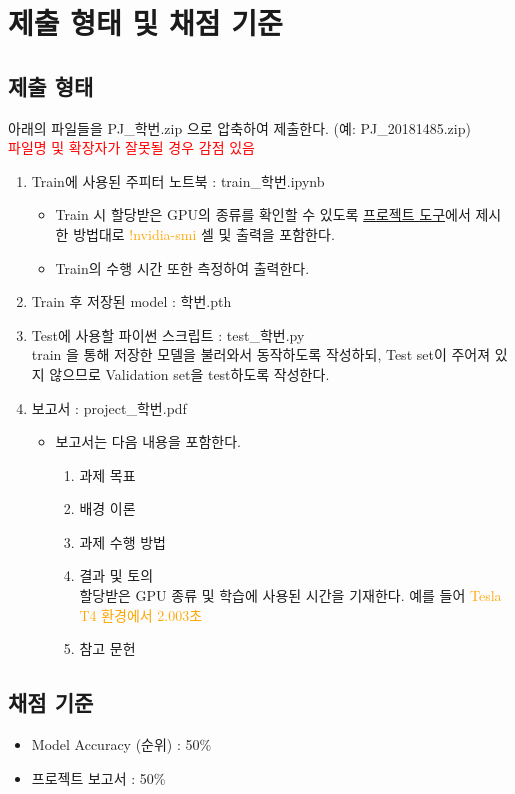\section{제출 형태 및 채점 기준}{\label{sec:eval}}

\subsection{제출 형태}
아래의 파일들을 \textcolor{RubineRed}{PJ\_학번.zip} 으로 압축하여 제출한다. (예: PJ\_20181485.zip)
\\ \textcolor{Red}{파일명 및 확장자가 잘못될 경우 감점 있음}
\begin{enumerate}\tightlist
    \item Train에 사용된 주피터 노트북 : \textcolor{RubineRed}{train\_학번.ipynb}
    \begin{itemize}
        \item Train 시 할당받은 GPU의 종류를 확인할 수 있도록
        \href{https://github.com/jaehyun-ko/EEE4178-Project-2022/blob/main/src/Project_2022_utils.ipynb}{프로젝트 도구}에서 제시한 방법대로
        \textcolor{Orange}{!nvidia-smi} 셀 및 출력을 포함한다.
        \item Train의 수행 시간 또한 측정하여 출력한다.
    \end{itemize}
    
    \item Train 후 저장된 model : \textcolor{RubineRed}{학번.pth}
    \item Test에 사용할 파이썬 스크립트 : \textcolor{RubineRed}{test\_학번.py}
    \\train 을 통해 저장한 모델을 불러와서 동작하도록 작성하되, Test set이 주어져 있지 않으므로 Validation set을 test하도록 작성한다.
    \item 보고서 : \textcolor{RubineRed}{project\_학번.pdf}
        \begin{itemize}
            \item 보고서는 다음 내용을 포함한다.
            \begin{enumerate}[1.]
                \item 과제 목표
                \item 배경 이론
                \item 과제 수행 방법
                \item 결과 및 토의
                \\ 할당받은 GPU 종류 및 학습에 사용된 시간을 기재한다. 예를 들어 \textcolor{Orange}{Tesla T4 환경에서 2.003초}
                \item 참고 문헌
            \end{enumerate}
        \end{itemize}
\end{enumerate}

\subsection{채점 기준}
    \begin{itemize}\tightlist
        \item Model Accuracy (순위) : 50\%
        \item 프로젝트 보고서 : 50\%
    \end{itemize}


